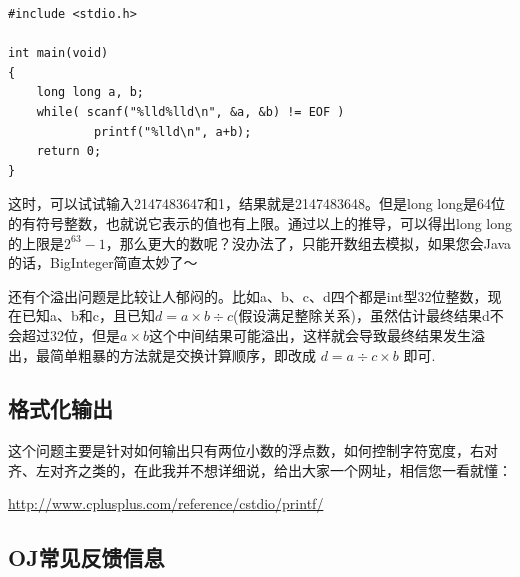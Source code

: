 \documentclass[11pt,twoside,a4paper,titlepage]{article}	%
\begin{document}
\begin{lstlisting}
#include <stdio.h>

int main(void)
{
	long long a, b;
	while( scanf("%lld%lld\n", &a, &b) != EOF )
			printf("%lld\n", a+b);
	return 0;
}
\end{lstlisting}

这时，可以试试输入2147483647和1，结果就是2147483648。但是long long是64位的有符号整数，也就说它表示的值也有上限。通过以上的推导，可以得出long long的上限是$2^{63} -1$，那么更大的数呢？没办法了，只能开数组去模拟，如果您会Java的话，BigInteger简直太妙了～

还有个溢出问题是比较让人郁闷的。比如a、b、c、d四个都是int型32位整数，现在已知a、b和c，且已知$d = a\times b\div c$(假设满足整除关系)，虽然估计最终结果d不会超过32位，但是$a\times b$这个中间结果可能溢出，这样就会导致最终结果发生溢出，最简单粗暴的方法就是交换计算顺序，即改成 $d = a\div c\times b$ 即可.

\subsection{格式化输出}
这个问题主要是针对如何输出只有两位小数的浮点数，如何控制字符宽度，右对齐、左对齐之类的，在此我并不想详细说，给出大家一个网址，相信您一看就懂：

\url{http://www.cplusplus.com/reference/cstdio/printf/}

\subsection{OJ常见反馈信息}
\end{document}
